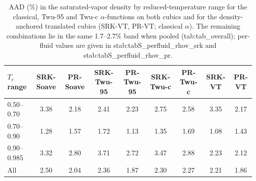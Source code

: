 \begin{table}[H]
\centering
\caption{AAD (\%) in the saturated-vapor density by reduced-temperature range for the classical, Twu-95 and Twu-c $\alpha$-functions on both cubics and for the density-anchored translated cubics (SRK-VT, PR-VT; classical $\alpha$). The remaining combinations lie in the same 1.7--2.7\% band when pooled ({tab:tab_overall}); per-fluid values are given in {stab:tabS_perfluid_rhov_srk} and {stab:tabS_perfluid_rhov_pr}.}
\label{tab:tab_rhov}
\small
\begin{tabular}{lcccccccc}
\toprule
$T_r$ range & SRK-Soave & PR-Soave & SRK-Twu-95 & PR-Twu-95 & SRK-Twu-c & PR-Twu-c & SRK-VT & PR-VT \\
\midrule
0.50–0.70 & 3.38 & 2.18 & 2.41 & 2.23 & 2.75 & 2.58 & 3.35 & 2.17 \\
0.70–0.90 & 1.28 & 1.57 & 1.72 & 1.13 & 1.35 & 1.69 & 1.08 & 1.43 \\
0.90–0.985 & 3.32 & 2.80 & 3.71 & 2.72 & 3.47 & 2.88 & 2.23 & 2.12 \\
All & 2.50 & 2.04 & 2.36 & 1.87 & 2.30 & 2.27 & 2.21 & 1.86 \\
\bottomrule
\end{tabular}
\end{table}
